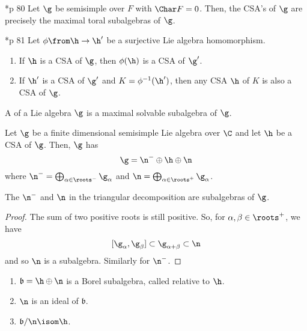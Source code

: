 \documentclass[11pt,leqno,oneside]{amsart}
\numberwithin{thm}{section}
\renewcommand{\b}{\mathfrak{b}}
\begin{document}
\begin{cor}
  \cite{humph}*{p 80} Let \(\g\) be semisimple over \(F\) with \(\Char F = 0\). Then, the
  CSA's of \(\g\) are precisely the maximal toral subalgebras of \(\g\).
\end{cor}
\begin{prop}
  \cite{humph}*{p 81} Let \(\phi \from \h \to \h'\) be a surjective Lie algebra
  homomorphism.
  \begin{enumerate}
  \item If \(\h\) is a CSA of \(\g\), then \(\phi(\h)\) is a CSA of
    \(\g'\).
  \item If \(\h'\) is a CSA of \(\g'\) and \(K = \phi^{-1}(\h')\),
    then any CSA \(\h\) of \(K\) is also a CSA of \(\g\).
  \end{enumerate}
\end{prop}
\begin{defn}
  A  of a Lie algebra \(\g\) is a maximal
  solvable subalgebra of \(\g\).
\end{defn}
\begin{defn}
  Let \(\g\) be a finite dimensional semisimple Lie algebra over
  \(\C\) and let \(\h\) be a CSA of \(\g\). Then, \(\g\) has
   \[
    \g = \n^{-} \oplus \h \oplus \n
  \]
  where \(\n^{-} = \bigoplus_{\alpha \in \roots^-} \g_\alpha\) and
  \(\n = \bigoplus_{\alpha \in \roots^+} \g_\alpha\). 
\end{defn}
\begin{prop}
  The \(\n^-\) and \(\n\) in the triangular decomposition are
  subalgebras of \(\g\).
\end{prop}
\begin{proof}
  The sum of two positive roots is still positive. So, for
  \(\alpha,\beta \in \roots^+\), we have \[
    [\g_\alpha, \g_\beta] \subset \g_{\alpha+\beta} \subset \n
  \]
  and so \(\n\) is a subalgebra. Similarly for \(\n^-\).
\end{proof}
\begin{prop}
  \begin{enumerate}
  \item   \(\b = \h \oplus \n\) is a Borel subalgebra, called 
    relative to \(\h\).
  \item \(\n\) is an ideal of \(\b\).
  \item \(\b/\n \isom \h\).
  \end{enumerate}
\end{prop}
\end{document}
